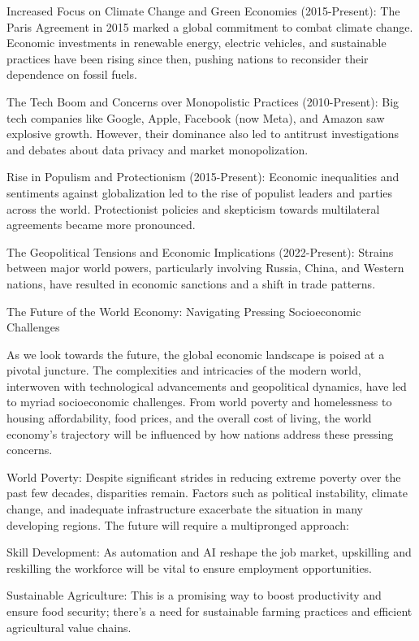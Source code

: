 Increased Focus on Climate Change and Green Economies (2015-Present): The Paris Agreement in 2015 marked a global commitment to combat climate change. Economic investments in renewable energy, electric vehicles, and sustainable practices have been rising since then, pushing nations to reconsider their dependence on fossil fuels.

The Tech Boom and Concerns over Monopolistic Practices (2010-Present): Big tech companies like Google, Apple, Facebook (now Meta), and Amazon saw explosive growth. However, their dominance also led to antitrust investigations and debates about data privacy and market monopolization.

Rise in Populism and Protectionism (2015-Present): Economic inequalities and sentiments against globalization led to the rise of populist leaders and parties across the world. Protectionist policies and skepticism towards multilateral agreements became more pronounced.

The Geopolitical Tensions and Economic Implications (2022-Present): Strains between major world powers, particularly involving Russia, China, and Western nations, have resulted in economic sanctions and a shift in trade patterns.

The Future of the World Economy: Navigating Pressing Socioeconomic Challenges

As we look towards the future, the global economic landscape is poised at a pivotal juncture. The complexities and intricacies of the modern world, interwoven with technological advancements and geopolitical dynamics, have led to myriad socioeconomic challenges. From world poverty and homelessness to housing affordability, food prices, and the overall cost of living, the world economy's trajectory will be influenced by how nations address these pressing concerns.

World Poverty:  Despite significant strides in reducing extreme poverty over the past few decades, disparities remain. Factors such as political instability, climate change, and inadequate infrastructure exacerbate the situation in many developing regions. The future will require a multipronged approach:

Skill Development: As automation and AI reshape the job market, upskilling and reskilling the workforce will be vital to ensure employment opportunities.

Sustainable Agriculture: This is a promising way to boost productivity and ensure food security; there's a need for sustainable farming practices and efficient agricultural value chains.

